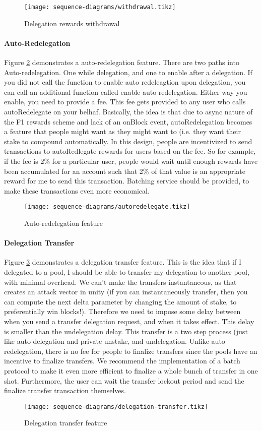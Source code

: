 \begin{figure}[ht]
\centering
\texttt{[image: sequence-diagrams/withdrawal.tikz]}
\caption{Delegation rewards withdrawal}
\label{fig:withdrawal}
\end{figure}


\paragraph{Auto-Redelegation}

Figure \ref{fig:redelegation} demonstrates a auto-redelegation feature. There are two paths into Auto-redelegation. One while delegation, and one to enable after a delegation. If you did not call the function to enable auto redeleagtion upon delegation, you can call an additional function called enable auto redelegation. Either way you enable, you need to provide a fee. This fee gets provided to any user who calls autoRedelegate on your belhaf. Basically, the idea is that due to async nature of the F1 rewards scheme and lack of an onBlock event, autoRedelegation becomes a feature that people might want as they might want to  (i.e. they want their stake to compound automatically. In this design, people are incentivized to send transactions to autoRedlegate rewards for users based on the fee. So for example, if the fee is 2\% for a particular user, people would wait until enough rewards have been accumulated for an account such that 2\% of that value is an appropriate reward for me to send this transaction. Batching service should be provided, to make these transactions even more economical. 

\begin{figure}[ht]
\centering
\texttt{[image: sequence-diagrams/autoredelegate.tikz]}
\caption{Auto-redelegation feature}
\label{fig:redelegation}
\end{figure}

\paragraph{Delegation Transfer}

Figure \ref{fig:delegation_transfer} demonstrates a delegation transfer feature. This is the idea that if I delegated to a pool, I should be able to transfer my delegation to another pool, with minimal overhead. We can't make the transfers instantaneous, as that creates an attack vector in unity (if you can instantaneously transfer, then you can compute the next delta parameter by changing the amount of stake, to preferentially win blocks!). Therefore we need to impose some delay between when you send a transfer delegation request, and when it takes effect. This delay is smaller than the undelegation delay. This transfer is a two step process (just like auto-delegation and private unstake, and undelegation. Unlike auto redelegation, there is no fee for people to finalize transfers since the pools have an incentive to finalize transfers. We recommend the implementation of a batch protocol to make it even more efficient to finalize a whole bunch of transfer in one shot. Furthermore, the user can wait the transfer lockout period and send the finalize transfer transaction themselves. 

\begin{figure}[ht]
\centering
\texttt{[image: sequence-diagrams/delegation-transfer.tikz]}
\caption{Delegation transfer feature}
\label{fig:delegation_transfer}
\end{figure}

